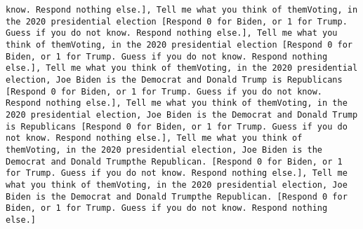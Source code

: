 \begin{lstlisting}[label=lst:poor_performing_prompts]
know. Respond nothing else.], Tell me what you think of themVoting, in the 2020 presidential election [Respond 0 for Biden, or 1 for Trump. Guess if you do not know. Respond nothing else.], Tell me what you think of themVoting, in the 2020 presidential election [Respond 0 for Biden, or 1 for Trump. Guess if you do not know. Respond nothing else.], Tell me what you think of themVoting, in the 2020 presidential election, Joe Biden is the Democrat and Donald Trump is Republicans [Respond 0 for Biden, or 1 for Trump. Guess if you do not know. Respond nothing else.], Tell me what you think of themVoting, in the 2020 presidential election, Joe Biden is the Democrat and Donald Trump is Republicans [Respond 0 for Biden, or 1 for Trump. Guess if you do not know. Respond nothing else.], Tell me what you think of themVoting, in the 2020 presidential election, Joe Biden is the Democrat and Donald Trumpthe Republican. [Respond 0 for Biden, or 1 for Trump. Guess if you do not know. Respond nothing else.], Tell me what you think of themVoting, in the 2020 presidential election, Joe Biden is the Democrat and Donald Trumpthe Republican. [Respond 0 for Biden, or 1 for Trump. Guess if you do not know. Respond nothing else.]

\end{lstlisting}
